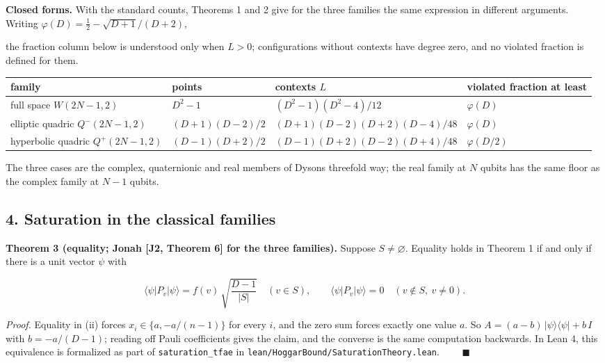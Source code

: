\documentclass[11pt,a4paper]{article}
\newcommand{\gt}{>}
\begin{document}
\textbf{Closed forms.} With the standard counts, Theorems 1 and 2 give for the three families the same
expression in different arguments. Writing \(\varphi(D) = \tfrac12 - \sqrt{D+1}/(D+2)\),

the fraction column below is understood only when \(L\gt 0\); configurations without contexts have
degree zero, and no violated fraction is defined for them.

{\def\LTcaptype{none} %
{\small
\begin{longtable}[]{@{}>{\raggedright\arraybackslash}p{}>{\raggedright\arraybackslash}p{}>{\raggedright\arraybackslash}p{}>{\raggedright\arraybackslash}p{}@{}}
\toprule\noalign{}
family & points & contexts \(L\) & violated fraction at least \\
\midrule\noalign{}
\endhead
\bottomrule\noalign{}
\endlastfoot
full space \(W(2N-1,2)\) & \(D^2-1\) & \((D^2-1)(D^2-4)/12\) & \(\varphi(D)\) \\
elliptic quadric \(Q^-(2N-1,2)\) & \((D+1)(D-2)/2\) & \((D+1)(D-2)(D+2)(D-4)/48\) & \(\varphi(D)\) \\
hyperbolic quadric \(Q^+(2N-1,2)\) & \((D-1)(D+2)/2\) & \((D-1)(D+2)(D-2)(D+4)/48\) & \(\varphi(D/2)\) \\
\end{longtable}
}
}

The three cases are the complex, quaternionic and real members of Dyson\textquotesingle s threefold way; the real
family at \(N\) qubits has the same floor as the complex family at \(N-1\) qubits.

\subsection{4. Saturation in the classical families}\label{4-saturation-in-the-classical-families}

\textbf{Theorem 3 (equality; Jonah {[}J2, Theorem 6{]} for the three families).} Suppose \(S\ne\varnothing\).
Equality holds in Theorem 1 if
and only if there is a unit vector \(\psi\) with

\[\langle \psi | P_v | \psi \rangle = f(v)\,\sqrt{\frac{D-1}{|S|}} \quad (v \in S), \qquad
\langle \psi | P_v | \psi \rangle = 0 \quad (v \notin S,\ v \ne 0).\]

\emph{Proof.} Equality in (ii) forces \(x_i \in \{a, -a/(n-1)\}\) for every \(i\), and the zero sum forces exactly
one value \(a\). So \(A = (a-b)\,|\psi\rangle\langle\psi| + b\,I\) with \(b = -a/(D-1)\); reading off Pauli
coefficients gives the claim, and the converse is the same computation backwards. In Lean 4, this
equivalence is formalized as part of \texttt{saturation\_tfae} in \nolinkurl{lean/HoggarBound/SaturationTheory.lean}. \(\qquad\blacksquare\)
\end{document}
